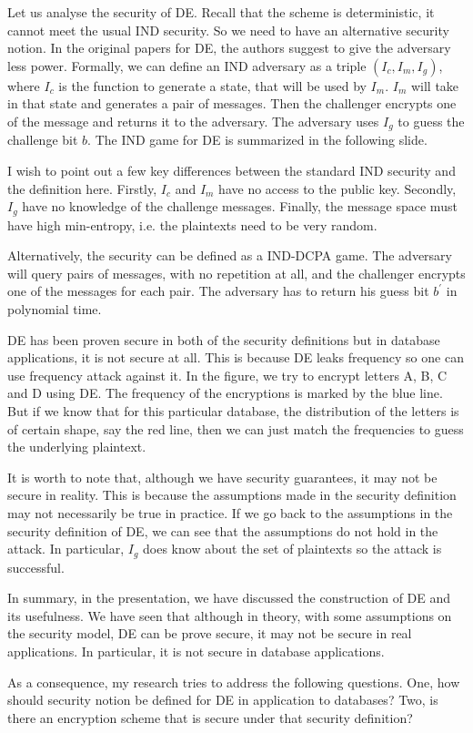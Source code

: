 \documentclass[10pt]{article}
\begin{document}
Let us analyse the security of DE. Recall that the scheme is deterministic, it cannot meet the usual IND security. So we need to have an alternative security notion. In the original papers for DE, the authors suggest to give the adversary less power. Formally, we can define an IND adversary as a triple $(I_c, I_m, I_g)$, where $I_c$ is the function to generate a state, that will be used by $I_m$. $I_m$ will take in that state and generates a pair of messages. Then the challenger encrypts one of the message and returns it to the adversary. The adversary uses $I_g$ to guess the challenge bit $b$. The IND game for DE is summarized in the following slide.

I wish to point out a few key differences between the standard IND security and the definition here. Firstly, $I_c$ and $I_m$ have no access to the public key. Secondly, $I_g$ have no knowledge of the challenge messages. Finally, the message space must have high min-entropy, i.e. the plaintexts need to be very random.

Alternatively, the security can be defined as a IND-DCPA game. The adversary will query pairs of messages, with no repetition at all, and the challenger encrypts one of the messages for each pair. The adversary has to return his guess bit $b^{'}$ in polynomial time.

DE has been proven secure in both of the security definitions but in database applications, it is not secure at all. This is because DE leaks frequency so one can use frequency attack against it. In the figure, we try to encrypt letters A, B, C and D using DE. The frequency of the encryptions is marked by the blue line. But if we know that for this particular database, the distribution of the letters is of certain shape, say the red line, then we can just match the frequencies to guess the underlying plaintext.

It is worth to note that, although we have security guarantees, it may not be secure in reality. This is because the assumptions made in the security definition may not necessarily be true in practice. If we go back to the assumptions in the security definition of DE, we can see that the assumptions do not hold in the attack. In particular, $I_g$ does know about the set of plaintexts so the attack is successful.

In summary, in the presentation, we have discussed the construction of DE and its usefulness. We have seen that although in theory, with some assumptions on the security model, DE can be prove secure, it may not be secure in real applications. In particular, it is not secure in database applications.

As a consequence, my research tries to address the following questions. One, how should security notion be defined for DE in application to databases? Two, is there an encryption scheme that is secure under that security definition?
\end{document}
